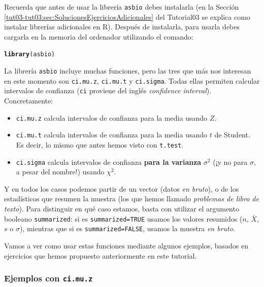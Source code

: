 \documentclass[10pt,a4paper]{article}\usepackage[]{graphicx}\usepackage[]{color}
\makeatletter
\newcommand{\hlstd}[1]{\textcolor[rgb]{0.345,0.345,0.345}{#1}}%
\newcommand{\hlkwd}[1]{\textcolor[rgb]{0.737,0.353,0.396}{\textbf{#1}}}%
\newenvironment{kframe}{%
 \def\at@end@of@kframe{}%
 \ifinner\ifhmode%
  \def\at@end@of@kframe{\end{minipage}}%
  \begin{minipage}{\columnwidth}%
 \fi\fi%
 \def\FrameCommand##1{\hskip\@totalleftmargin \hskip-\fboxsep
 \colorbox{shadecolor}{##1}\hskip-\fboxsep
     \hskip-\linewidth \hskip-\@totalleftmargin \hskip\columnwidth}%
 \MakeFramed {\advance\hsize-\width
   \@totalleftmargin\z@ \linewidth\hsize
   \@setminipage}}%
 {\par\unskip\endMakeFramed%
 \at@end@of@kframe}
\newenvironment{knitrout}{}{} %
\makeatother
\begin{document}
Recuerda que antes de usar la librería {\tt asbio} debes instalarla (en la Sección \ref{tut03-tut03:sec:SolucionesEjerciciosAdicionales} del Tutorial03 se explica como instalar librerías adicionales en R). Después de instalarla, para usarla debes cargarla en la memoria del ordenador  utilizando el comando:
\begin{knitrout}
\color{fgcolor}\begin{kframe}
\begin{alltt}
    \hlkwd{library}\hlstd{(asbio)}
\end{alltt}


{\ttfamily\noindent\itshape\color{messagecolor}{\#\# Loading required package: tcltk}}\end{kframe}
\end{knitrout}
La librería {\tt asbio} incluye muchas funciones, pero las tres que más nos interesan en este momento son
{\tt ci.mu.z},   {\tt ci.mu.t} y {\tt  ci.sigma}. Todas ellas permiten calcular intervalos de confianza ({\tt ci} proviene del inglés {\em confidence interval}). Concretamente:
\begin{itemize}
  \item {\tt ci.mu.z} calcula intervalos de confianza  para la media usando $Z$.
  \item {\tt ci.mu.t} calcula intervalos de confianza  para la media usando $t$ de Student. Es decir, lo mismo que antes hemos visto con {\tt t.test}.
  \item {\tt ci.sigma} calcula intervalos de confianza {\bf para la varianza} $\sigma^2$  (¡y no para $\sigma$, a pesar del nombre!) usando $\chi^2$.
\end{itemize}
Y en todos los casos podemos partir de un vector (datos {\em en bruto}), o de los estadísticos que resumen la muestra (los que hemos llamado {\em problemas de libro de texto}). Para distinguir en qué caso estamos, basta con utilizar el argumento booleano {\tt summarized}: si es {\tt summarized=TRUE} usamos los valores resumidos ($n$, $\bar X$, $s$ o $\sigma$), mientras que si es {\tt summarized=FALSE}, usamos la muestra {\em en bruto}.

Vamos a ver como usar estas funciones mediante algunos ejemplos, basados en ejercicios que hemos propuesto anteriormente en este tutorial.

\subsubsection*{Ejemplos con {\tt ci.mu.z}}
\end{document}
